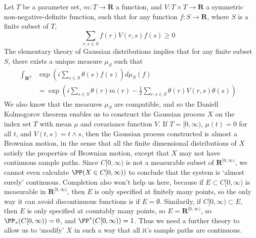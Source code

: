 \begin{example}
    Let $T$ be a parameter set, $m: T \to \mathbf{R}$ a function, and $V: T \times T \to \mathbf{R}$ a symmetric non-negative-definite function, such that for any function $f: S \to \mathbf{R}$, where $S$ is a finite subset of $T$,
    \[ \sum_{r,s \in S} f(r) V(r,s) f(s) \geq 0 \]
    The elementary theory of Gaussian distributions implies that for any finite subset $S$, there exists a unique measure $\mu_S$ such that
    \begin{align*}
        \int_{\mathbf{R}^S} &\exp \left( i \sum_{s \in S} \theta(s) f(s) \right) d\mu_S(f)\\
        &= \exp \left( i \sum_{s \in S} \theta(r) m(r) - \frac{1}{2} \sum_{r,s \in S} \theta(r) V(r,s) \theta(s) \right)
    \end{align*}
    We also know that the measures $\mu_S$ are compatible, and so the Daniell Kolmogorov theorem enables us to construct the Gaussian process $X$ on the index set $T$ with mean $\mu$ and covariance function $V$. If $T = [0,\infty)$, $\mu(t) = 0$ for all $t$, and $V(t,s) = t \wedge s$, then the Gaussian process constructed is almost a Brownian motion, in the sense that all the finite dimensional distributions of $X$ satisfy the properties of Brownian motion, except that $X$ may not have continuous sample paths. Since $C[0,\infty)$ is not a measurable subset of $\mathbf{R}^{[0,\infty)}$, we cannot even calculate $\PP(X \in C[0,\infty))$ to conclude that the system is `almost surely' continuous. Completion also won't help us here, because if $E \subset C[0,\infty)$ is measurable in $\mathbf{R}^{[0,\infty)}$, then $E$ is only specified at finitely many points, so the only way it can avoid discontinuous functions is if $E = \emptyset$. Similarily, if $C[0,\infty) \subset E$, then $E$ is only specified at countably many points, so $E = \mathbf{R}^{[0,\infty)}$, so $\PP_*(C[0,\infty)) = 0$, and $\PP^*(C[0,\infty)) = 1$. Thus we need a further theory to allow us to `modify' $X$ in such a way that all it's sample paths are continuous.
\end{example}

